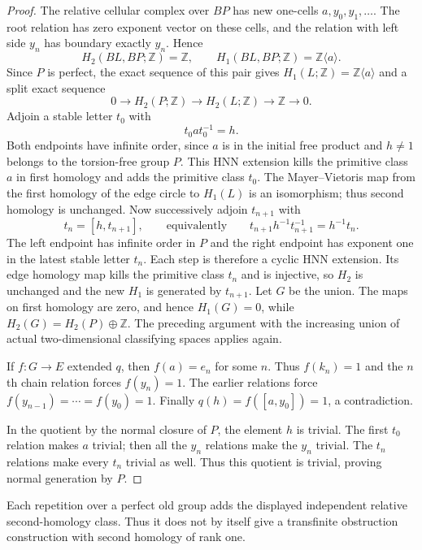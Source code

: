 \begin{proof}
The relative cellular complex over $BP$ has new one-cells
$a,y_0,y_1,\ldots$. The root relation has zero exponent vector on
these cells, and the relation with left side $y_n$ has boundary
exactly $y_n$. Hence
\[
 H_2(BL,BP;\mathbb Z)=\mathbb Z,\qquad
 H_1(BL,BP;\mathbb Z)=\mathbb Z\langle a\rangle.
\]
Since $P$ is perfect, the exact sequence of this pair gives
$H_1(L;\mathbb Z)=\mathbb Z\langle a\rangle$ and a split exact
sequence
\[
 0\longrightarrow H_2(P;\mathbb Z)
 \longrightarrow H_2(L;\mathbb Z)
 \longrightarrow\mathbb Z\longrightarrow0.
\]
Adjoin a stable letter $t_0$ with
\[
 t_0 a t_0^{-1}=h.
\]
Both endpoints have infinite order, since $a$ is in the initial free
product and $h\ne1$ belongs to the torsion-free group $P$.
This HNN extension kills the primitive class $a$ in first homology
and adds the primitive class $t_0$. The Mayer--Vietoris map from the
first homology of the edge circle to $H_1(L)$ is an isomorphism;
thus second homology is unchanged. Now successively adjoin $t_{n+1}$
with
\[
 t_n=[h,t_{n+1}],\qquad\text{equivalently}\qquad
 t_{n+1}h^{-1}t_{n+1}^{-1}=h^{-1}t_n.
\]
The left endpoint has infinite order in $P$ and the right endpoint
has exponent one in the latest stable letter $t_n$. Each step is
therefore a cyclic HNN extension. Its edge homology map kills the
primitive class $t_n$ and is injective, so $H_2$ is unchanged and the
new $H_1$ is generated by $t_{n+1}$. Let $G$ be the union. The maps
on first homology are zero, and hence $H_1(G)=0$, while
$H_2(G)=H_2(P)\oplus\mathbb Z$. The preceding argument with the
increasing union of actual two-dimensional classifying spaces applies
again.

If $f:G\to E$ extended $q$, then $f(a)=e_n$ for some $n$. Thus
$f(k_n)=1$ and the $n$th chain relation forces $f(y_n)=1$.
The earlier relations force $f(y_{n-1})=\cdots=f(y_0)=1$.
Finally $q(h)=f([a,y_0])=1$, a contradiction.

In the quotient by the normal closure of $P$, the element $h$ is
trivial. The first $t_0$ relation makes $a$ trivial; then all the
$y_n$ relations make the $y_n$ trivial. The $t_n$ relations make
every $t_n$ trivial as well. Thus this quotient is trivial, proving
normal generation by $P$.
\end{proof}

Each repetition over a perfect old group adds the displayed independent
relative second-homology class. Thus it does not by itself give a
transfinite obstruction construction with second homology of rank one.
